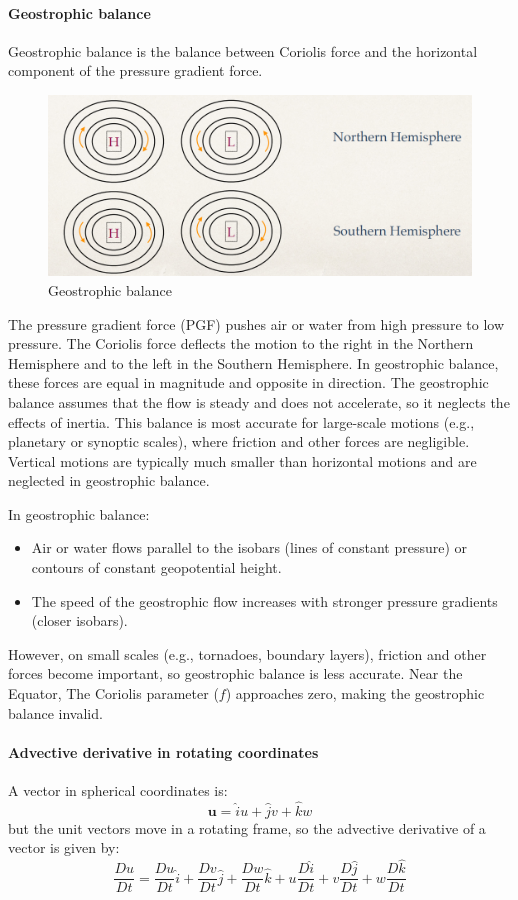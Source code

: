 \paragraph{Geostrophic balance} Geostrophic balance is the balance between Coriolis force and the horizontal component of the pressure gradient force.
\begin{figure}
    \centering
    \includegraphics[width=0.5\linewidth]{uploads/Screenshot 2024-11-20 195919.png}
    \caption{Geostrophic balance}
    
\end{figure}
The pressure gradient force (PGF) pushes air or water from high pressure to low pressure. The Coriolis force deflects the motion to the right in the Northern Hemisphere and to the left in the Southern Hemisphere. In geostrophic balance, these forces are equal in magnitude and opposite in direction. The geostrophic balance assumes that the flow is steady and does not accelerate, so it neglects the effects of inertia. This balance is most accurate for large-scale motions (e.g., planetary or synoptic scales), where friction and other forces are negligible. Vertical motions are typically much smaller than horizontal motions and are neglected in geostrophic balance.

In geostrophic balance:
\begin{itemize}
    \item Air or water flows parallel to the isobars (lines of constant pressure) or contours of constant geopotential height. 
    \item The speed of the geostrophic flow increases with stronger pressure gradients (closer isobars).
\end{itemize}
However, on small scales (e.g., tornadoes, boundary layers), friction and other forces become important, so geostrophic balance is less accurate. Near the Equator, The Coriolis parameter ($f$) approaches zero, making the geostrophic balance invalid.

\paragraph{Advective derivative in rotating coordinates} A vector in spherical coordinates is:
$$\mathbf{u}=\hat{i}u+\hat{j}v+\hat{k}w$$
but the unit vectors move in a rotating frame, so the advective derivative of a vector is given by: 
\begin{equation}\label{eq.adv der in rotating}
    \frac{Du}{Dt}=\frac{Du}{Dt}\hat{i}+\frac{Dv}{Dt}\hat{j}+\frac{Dw}{Dt}\hat{k}+u\frac{D\hat{i}}{Dt}+v\frac{D\hat{j}}{Dt}+w\frac{D\hat{k}}{Dt}
\end{equation}

